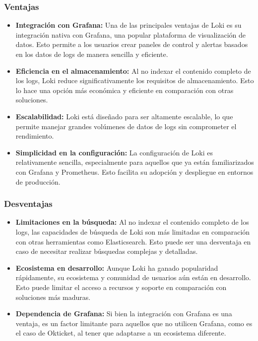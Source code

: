 \subsubsection{Ventajas}
\begin{itemize}
    \item \textbf{Integración con Grafana:} Una de las principales ventajas de
		Loki es su integración nativa con Grafana, una popular plataforma de
			visualización de datos. Esto permite a los usuarios crear paneles de
			control y alertas basados en los datos de logs de manera sencilla y
			eficiente.
    \item \textbf{Eficiencia en el almacenamiento:} Al no indexar el contenido
		completo de los logs, Loki reduce significativamente los requisitos de
		almacenamiento. Esto lo hace una opción más económica y eficiente en
		comparación con otras soluciones.
    \item \textbf{Escalabilidad:} Loki está diseñado para ser altamente
		escalable, lo que permite manejar grandes volúmenes de datos de logs sin
		comprometer el rendimiento.
    \item \textbf{Simplicidad en la configuración:} La configuración de Loki es
		relativamente sencilla, especialmente para aquellos que ya están
		familiarizados con Grafana y Prometheus. Esto facilita su adopción y
		despliegue en entornos de producción.
\end{itemize}

\subsubsection{Desventajas}
\begin{itemize}
    \item \textbf{Limitaciones en la búsqueda:} Al no indexar el contenido
		completo de los logs, las capacidades de búsqueda de Loki son más
		limitadas en comparación con otras herramientas como Elasticsearch.
		Esto puede ser una desventaja en caso de necesitar realizar búsquedas
		complejas y detalladas.
    \item \textbf{Ecosistema en desarrollo:} Aunque Loki ha ganado popularidad
		rápidamente, su ecosistema y comunidad de usuarios aún están en
		desarrollo. Esto puede limitar el acceso a recursos y soporte en
		comparación con soluciones más maduras.
    \item \textbf{Dependencia de Grafana:} Si bien la integración con Grafana es
		una ventaja, es un factor limitante para aquellos que no utilicen
		Grafana, como es el caso de Okticket, al tener que adaptarse a un
		ecosistema diferente.
\end{itemize}

